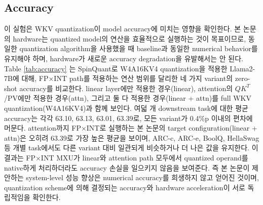 \documentclass[11pt]{article}
\newcommand{\wkv}{WKV}
\begin{document}
\subsection{Accuracy}

이 실험은 WKV quantization이 model accuracy에 미치는 영향을 확인한다. 본 논문의 hardware는 quantized model의 연산을 효율적으로 실행하는 것이 목표이므로, 동일한 quantization algorithm을 사용했을 때 baseline과 동일한 numerical behavior를 유지해야 하며, hardware가 새로운 accuracy degradation을 유발해서는 안 된다.
Table \ref{tab:accuracy} 는 SpinQuant로 W4A16KV4 quantization을 적용한 Llama2-7B에 대해, FP×INT path를 적용하는 연산 범위를 달리한 네 가지 variant의 zero-shot accuracy를 비교한다. linear layer에만 적용한 경우(linear), attention의 $QK^T$/PV에만 적용한 경우(attn), 그리고 둘 다 적용한 경우(linear + attn)를 full WKV quantization(W4A16KV4)과 함께 보인다. 여덟 개 downstream task에 대한 평균 accuracy는 각각 63.10, 63.13, 63.01, 63.39로, 모든 variant가 0.4\%p 이내의 편차에 머문다. attention까지 FP×INT로 실행하는 본 논문의 target configuration(linear + attn)은 오히려 63.39로 가장 높은 평균을 보이며, ARC-c, ARC-e, BoolQ, HellaSwag 등 개별 task에서도 다른 variant 대비 일관되게 비슷하거나 더 나은 값을 유지한다.
이 결과는 FP×INT MXU가 linear와 attention path 모두에서 quantized operand를 native하게 처리하더라도 accuracy 손실을 일으키지 않음을 보여준다. 즉 본 논문이 제안하는 system-level 성능 향상은 numerical accuracy를 희생하지 않고 얻어진 것이며, quantization scheme에 의해 결정되는 accuracy와 hardware acceleration이 서로 독립적임을 확인한다.

\begin{table}[t]
\centering
\caption{Zero-shot accuracy and ppl comparison of W4A16KV4 variants.}
\label{tab:accuracy}
\end{table}
\end{document}
